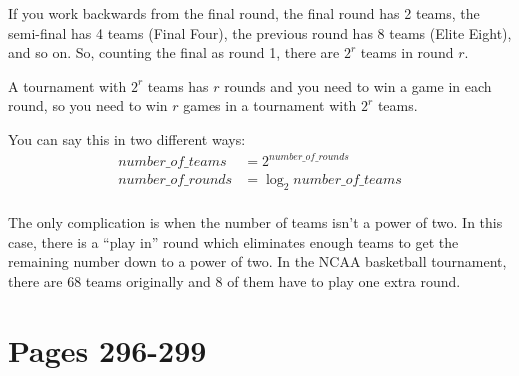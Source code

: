 \documentclass[fleqn,addpoints]{exam}
\begin{document}
\begin{solution}

If you work backwards from the final round, the final round has 2 teams, the semi-final has 4 teams (Final Four), the
previous round has 8 teams (Elite Eight), and so on.  So, counting the final as round 1, there are $2^r$ teams in
round $r$.

A tournament with $2^r$ teams has $r$ rounds and you need to win a game in each round, so you need to win $r$ games in a 
tournament with $2^r$ teams.

You can say this in two different ways:
\begin{align*}
  number\_of\_teams &= 2^{number\_of\_rounds} \\
  number\_of\_rounds &= \log_2 number\_of\_teams \\
\end{align*}

The only complication is when the number of teams isn't a power of two.  In this case, there is a ``play in'' round
which eliminates enough teams to get the remaining number down to a power of two.  In the NCAA basketball tournament,
there are 68 teams originally and 8 of them have to play one extra round.

\end{solution}

\ifprintanswers

\section{Pages 296-299}
\end{document}
